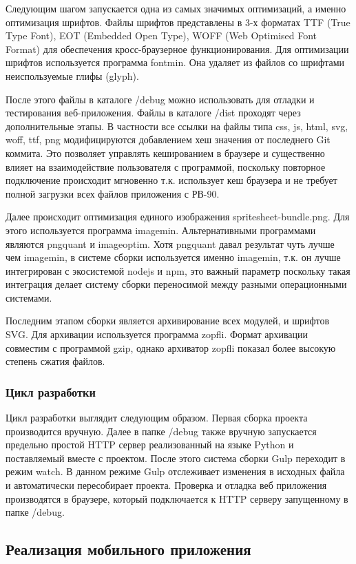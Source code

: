 Следующим шагом запускается одна из самых значимых оптимизаций, а именно оптимизация шрифтов. Файлы шрифтов представлены в 3-х форматах TTF (True Type Font), EOT (Embedded Open Type), WOFF (Web Optimised Font Format) для обеспечения кросс-браузерное функционирования. Для оптимизации шрифтов используется программа fontmin. Она удаляет из файлов со шрифтами неиспользуемые глифы (glyph).

После этого файлы в каталоге /debug можно использовать для отладки и тестирования веб-приложения. Файлы в каталоге /dist проходят через дополнительные этапы. В частности все ссылки на файлы типа css, js, html, svg, woff, ttf, png модифицируются добавлением хеш значения от последнего Git коммита. Это позволяет управлять кешированием в браузере и существенно влияет на взаимодействие пользователя с программой, поскольку повторное подключение происходит мгновенно т.к. использует кеш браузера и не требует полной загрузки всех файлов приложения с РВ-90.    

Далее происходит оптимизация единого изображения spritesheet-bundle.png. Для этого используется программа imagemin. Альтернативными программами являются pngquant и imageoptim. Хотя pngquant давал результат чуть лучше чем imagemin, в системе сборки используется именно imagemin, т.к. он лучше интегрирован с экосистемой nodejs и npm, это важный параметр поскольку такая интеграция делает систему сборки переносимой между разными операционными системами. 

Последним этапом сборки является архивирование всех модулей, и шрифтов SVG. Для архивации используется программа zopfli. Формат архивации совместим с программой gzip, однако архиватор zopfli показал более высокую степень сжатия файлов.

\subsubsection{Цикл разработки}
Цикл разработки выглядит следующим образом. Первая сборка проекта производится вручную. Далее в папке /debug также вручную запускается предельно простой HTTP сервер реализованный на языке Python и поставляемый вместе с проектом. После этого система сборки Gulp переходит в режим watch. В данном режиме Gulp отслеживает изменения в исходных файла и автоматически пересобирает проекта. Проверка и отладка веб приложения производятся в браузере, который подключается к HTTP серверу запущенному в папке /debug. 


\subsection{Реализация мобильного приложения}

